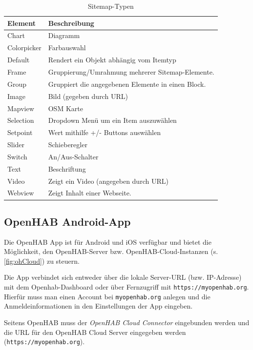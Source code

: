 \begin{table}[H]
	\centering
	\setlength\extrarowheight{2pt}
	\begin{tabularx}{\textwidth}{LX}  
		\toprule
		\textbf{Element} & \textbf{Beschreibung}\\
		\midrule
		Chart 	&  Diagramm\\
		Colorpicker	&  Farbauswahl \\
		Default   &	Rendert ein Objekt abhängig vom Itemtyp \\
		Frame   & Gruppierung/Umrahmung mehrerer Sitemap-Elemente. \\
		Group   & Gruppiert die angegebenen Elemente in einen Block.\\
		Image   & Bild (gegeben durch URL)\\
		Mapview   & OSM Karte \\
		Selection   & Dropdown Menü um ein Item auszuwählen \\
		Setpoint  & Wert mithilfe +/- Buttons auswählen \\
		Slider & Schieberegler \\
		Switch & An/Aus-Schalter \\
		Text & Beschriftung \\
		Video & Zeigt ein Video (angegeben durch URL) \\
		Webview & Zeigt Inhalt einer Webseite.\\
		\bottomrule 
	\end{tabularx}
	\caption{Sitemap-Typen}
	\label{tbl:sitemapss}
\end{table}



\subsection{OpenHAB Android-App}
Die OpenHAB App ist für Android und iOS verfügbar und bietet die Möglichkeit, den OpenHAB-Server bzw. OpenHAB-Cloud-Instanzen (s. \autoref{fig:ohCloud}) zu steuern.

Die App verbindet sich entweder über die lokale Server-URL (bzw. IP-Adresse) mit dem Openhab-Dashboard oder über Fernzugriff mit \texttt{https://myopenhab.org}. Hierfür muss man einen Account bei \texttt{myopenhab.org} anlegen und die Anmeldeinformationen in den Einstellungen der App eingeben.

Seitens OpenHAB muss der \textit{OpenHAB Cloud Connector} eingebunden werden und die URL für den OpenHAB Cloud Server eingegeben werden (\texttt{https://myopenhab.org}).


